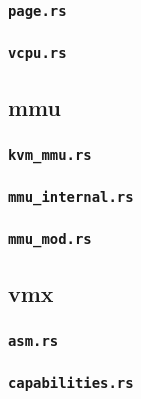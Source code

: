 \documentclass[code]{mancls}
\begin{document}
\subsubsection{\texttt{page.rs}}


\subsubsection{\texttt{vcpu.rs}}


\subsection{mmu}

\subsubsection{\texttt{kvm\_mmu.rs}}



\subsubsection{\texttt{mmu\_internal.rs}}



\subsubsection{\texttt{mmu\_mod.rs}}


\subsection{vmx}

\subsubsection{\texttt{asm.rs}}


\subsubsection{\texttt{capabilities.rs}}

\end{document}
